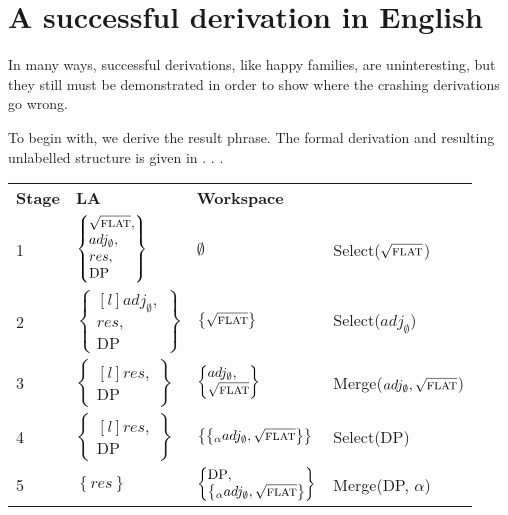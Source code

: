 \documentclass[MilwayThesis]{subfiles}
\begin{document}
\section{A successful derivation in English}
In many ways, successful derivations, like happy families, are uninteresting, but they still must be demonstrated in order to show where the crashing derivations go wrong.

To begin with, we derive the result phrase.
The formal derivation and resulting unlabelled structure is given in \Next.
\ex.
\a.
\begin{tabular}[t]{llll}
	\textbf{Stage} & \textbf{LA} & \textbf{Workspace} & \\
	\cline{1-3}
	1 & $
	\begin{Bmatrix*}[l]
		\sqrt{\textsc{flat}},\\
		adj_\emptyset,\\
		res,\\
		\text{DP}
	\end{Bmatrix*}
	$ & $\emptyset$ & Select($\sqrt{\textsc{flat}}$)\\
	2 & $
	\begin{Bmatrix*}[l]
		adj_\emptyset,\\
		res,\\
		\text{DP}
	\end{Bmatrix*}
	$ & $\left\{\sqrt{\textsc{flat}}\right\}$ & Select($adj_\emptyset$)\\
	3 & $
	\begin{Bmatrix*}[l]
		res,\\
		\text{DP}
	\end{Bmatrix*}
	$ & $
	\begin{Bmatrix*}[l]
		adj_\emptyset,\\
		\sqrt{\textsc{flat}}
	\end{Bmatrix*}$
	& Merge($adj_\emptyset, \sqrt{\textsc{flat}}$)\\
	4 & $
	\begin{Bmatrix*}[l]
		res,\\
		\text{DP}
	\end{Bmatrix*}
	$ & $\left\{ \left\{_\alpha adj_\emptyset, \sqrt{\textsc{flat}} \right\} \right\}$ & Select(DP)\\
	5 & $\left\{ res \right\}$ & $
	\begin{Bmatrix*}[l]
		\text{DP},\\
		\left\{_\alpha adj_\emptyset, \sqrt{\textsc{flat}} \right\}
	\end{Bmatrix*}
	$ & Merge(DP, $\alpha$)\\

\end{tabular}
\end{document}
